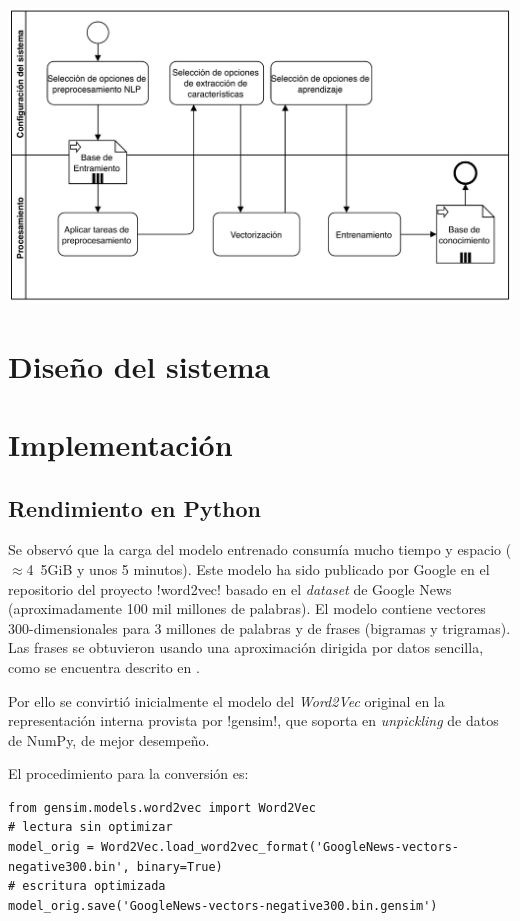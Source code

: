 \includegraphics[width=\textwidth]{bpmn-entrenamiento}



\chapter{Diseño del sistema}

\chapter{Implementación}

\section{Rendimiento en Python}

Se observó que la carga del modelo entrenado  consumía mucho tiempo y espacio ($\approx$\si{4.5}{GiB} y unos 5 minutos). Este modelo ha sido publicado por Google en el repositorio del proyecto \code!word2vec! basado en el \emph{dataset} de Google News (aproximadamente 100 mil millones de palabras). El modelo contiene vectores 300-dimensionales para 3 millones de palabras y de frases (bigramas y trigramas). Las frases se obtuvieron usando una aproximación dirigida por datos sencilla, como se encuentra descrito en \cite{DBLP:journals/corr/MikolovSCCD13}.

Por ello se convirtió inicialmente el modelo del \emph{Word2Vec} original en la representación interna provista por \code!gensim!, que soporta en \emph{unpickling} de datos de NumPy, de mejor desempeño.

El procedimiento para la conversión es:

\begin{verbatim}
from gensim.models.word2vec import Word2Vec
# lectura sin optimizar
model_orig = Word2Vec.load_word2vec_format('GoogleNews-vectors-negative300.bin', binary=True)
# escritura optimizada
model_orig.save('GoogleNews-vectors-negative300.bin.gensim')
\end{verbatim}

